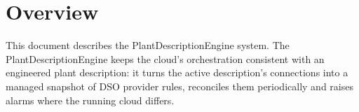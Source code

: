 \documentclass[a4paper]{arrowhead}
\begin{document}
\sloppy

\ArrowheadSetup

\begin{center}
  \vspace*{1cm}
  \huge{\arrowtitle}

  \vspace*{0.2cm}
  \LARGE{\arrowtype}
  \vspace*{1cm}

  \vspace*{\fill}


  \vspace*{1cm}
  \vspace*{\fill}

  \begin{abstract}
    This document describes the PlantDescriptionEngine support system of the Eclipse Arrowhead 5.2.2 framework, as implemented in \texttt{ah5-PlantDescriptionEngine-java-spring} of the primary Java source tree (\texttt{Eclipse-Arrowhead-java}) and deployed with the standalone Compose definition of that folder.
  \end{abstract}

  \vspace*{1cm}
\end{center}

\newpage

\tableofcontents
\newpage

\section{Overview}
\label{sec:overview}

This document describes the PlantDescriptionEngine system. The Plant\allowbreak{}Description\allowbreak{}Engine keeps the cloud's orchestration consistent with an engineered plant description: it turns the active description's connections into a managed snapshot of DSO provider rules, reconciles them periodically and raises alarms where the running cloud differs.
\end{document}
